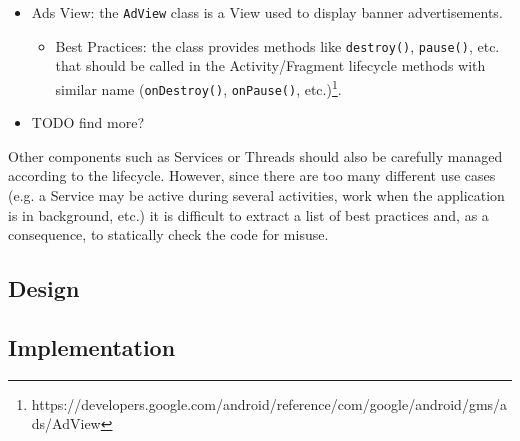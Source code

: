 \documentclass[11pt,a4paper,notitlepage]{article}
\begin{document}
\begin{itemize}
\begin{itemize}
		\end{itemize}
	\item Ads View: the \texttt{AdView} class is a View used to display banner advertisements.
	\begin{itemize}
		\item Best Practices: the class provides methods like \texttt{destroy()}, \texttt{pause()}, etc. that should be called in the Activity/Fragment lifecycle methods with similar name (\texttt{onDestroy()}, \texttt{onPause()}, etc.)\footnote{https://developers.google.com/android/reference/com/google/android/gms/ads/AdView}.
	\end{itemize}
	\item TODO find more?
\end{itemize}
Other components such as Services or Threads should also be carefully managed according to the lifecycle. However, since there are too many different use cases (e.g. a Service may be active during several activities, work when the application is in background, etc.) it is difficult to extract a list of best practices and, as a consequence, to statically check the code for misuse.

\subsection{Design}

\subsection{Implementation}
\end{document}
